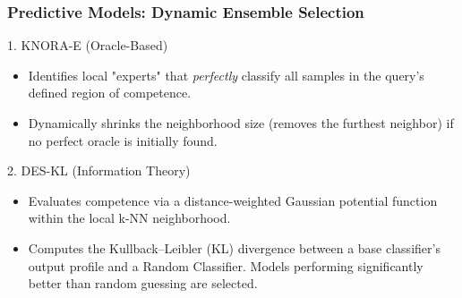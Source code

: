 \documentclass[aspectratio=169,xcolor=dvipsnames]{beamer}
\begin{document}

\begin{frame}
\frametitle{Predictive Models: Dynamic Ensemble Selection}

\begin{block}{1. KNORA-E (Oracle-Based)}
        \begin{itemize}
            \item Identifies local "experts" that \textit{perfectly} classify all samples in the query's defined region of competence.
            \item Dynamically shrinks the neighborhood size (removes the furthest neighbor) if no perfect oracle is initially found.
        \end{itemize}
    \end{block}

    \begin{block}{2. DES-KL (Information Theory)}
        \begin{itemize}
            \item Evaluates competence via a distance-weighted Gaussian potential function within the local k-NN neighborhood.
            \item Computes the Kullback--Leibler (KL) divergence between a base classifier's output profile and a Random Classifier. Models performing significantly better than random guessing are selected.
        \end{itemize}
    \end{block}

\end{frame}

\end{document}
